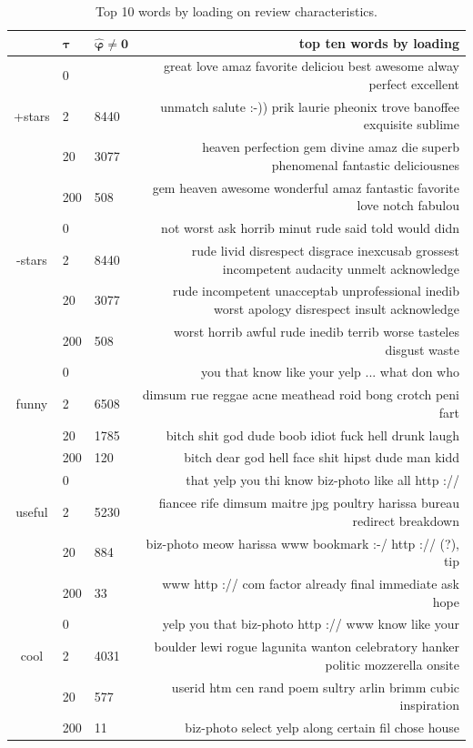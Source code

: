 \documentclass[12pt]{article}
\newcommand{\bs}[1]{\boldsymbol{#1}}
\begin{document}
\begin{table}[p]\vspace{-.5cm}
\small{}
\hspace{-1cm}
\begin{tabular}{cll|r}
& $\bs{\tau}$ & $\bs{\hat\varphi \neq 0}$ & {\bf top ten words by loading}\\
\hline
 & 0 &  & \footnotesize  great love amaz favorite deliciou best awesome alway perfect excellent \\
+stars & 2 & 8440 & \footnotesize  unmatch salute :-)) prik laurie pheonix trove banoffee exquisite sublime \\
 & 20 & 3077 & \footnotesize  heaven perfection gem divine amaz die superb phenomenal fantastic deliciousnes \\
 & 200 & 508 & \footnotesize  gem heaven awesome wonderful amaz fantastic favorite love notch fabulou \\
\hline
 & 0 &  & \footnotesize  not worst ask horrib minut rude said told would didn \\
-stars & 2 & 8440 & \footnotesize  rude livid disrespect disgrace inexcusab grossest incompetent audacity unmelt acknowledge \\
 & 20 & 3077 & \footnotesize  rude incompetent unacceptab unprofessional inedib worst apology disrespect insult acknowledge \\
 & 200 & 508 & \footnotesize  worst horrib awful rude inedib terrib worse tasteles disgust waste \\
\hline
 & 0 &  & \footnotesize  you that know like your yelp ... what don who \\
funny & 2 & 6508 & \footnotesize  dimsum rue reggae acne meathead roid bong crotch peni fart \\
 & 20 & 1785 & \footnotesize  bitch shit god dude boob idiot fuck hell drunk laugh \\
 & 200 & 120 & \footnotesize  bitch dear god hell face shit hipst dude man kidd \\
\hline
 & 0 &  & \footnotesize  that yelp you thi know biz-photo like all http :// \\
useful & 2 & 5230 & \footnotesize  fiancee rife dimsum maitre jpg poultry harissa bureau redirect breakdown \\
 & 20 & 884 & \footnotesize  biz-photo meow harissa www bookmark :-/ http :// (?), tip \\
 & 200 & 33 & \footnotesize  www http :// com factor already final immediate ask hope \\
\hline
 & 0 &  & \footnotesize  yelp you that biz-photo http :// www know like your \\
cool & 2 & 4031 & \footnotesize  boulder lewi rogue lagunita wanton celebratory hanker politic mozzerella onsite \\
 & 20 & 577 & \footnotesize  userid htm cen rand poem sultry arlin brimm cubic inspiration \\
 & 200 & 11 & \footnotesize  biz-photo select yelp along certain fil chose house  \\
\hline\end{tabular}
\caption[l]{\label{topwords}
Top 10 words by loading on review characteristics.\hfill}


\end{table}
\end{document}
